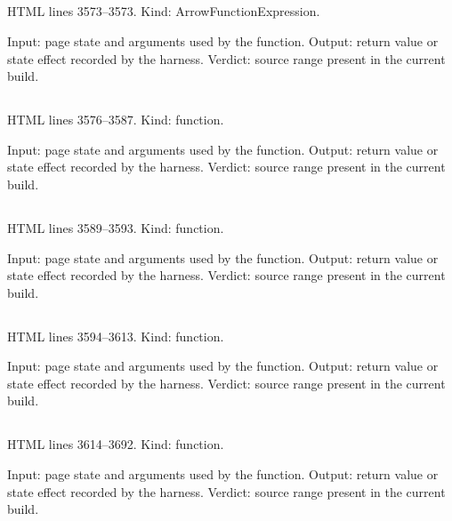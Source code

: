 \subsection*{\texttt{}}
\label{vf_120_qsRGB}
HTML lines 3573--3573. Kind: ArrowFunctionExpression.

Input: page state and arguments used by the function.
Output: return value or state effect recorded by the harness.
Verdict: source range present in the current build.

\subsection*{\texttt{}}
\label{vf_121_qsInstrument}
HTML lines 3576--3587. Kind: function.

Input: page state and arguments used by the function.
Output: return value or state effect recorded by the harness.
Verdict: source range present in the current build.

\subsection*{\texttt{}}
\label{vf_122_javaHashOrder}
HTML lines 3589--3593. Kind: function.

Input: page state and arguments used by the function.
Output: return value or state effect recorded by the harness.
Verdict: source range present in the current build.

\subsection*{\texttt{}}
\label{vf_123_qsHeader}
HTML lines 3594--3613. Kind: function.

Input: page state and arguments used by the function.
Output: return value or state effect recorded by the harness.
Verdict: source range present in the current build.

\subsection*{\texttt{}}
\label{vf_124_qsTables}
HTML lines 3614--3692. Kind: function.

Input: page state and arguments used by the function.
Output: return value or state effect recorded by the harness.
Verdict: source range present in the current build.

